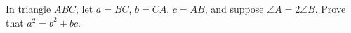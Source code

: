 In triangle $ABC$, let $a=BC$, $b=CA$, $c=AB$, and suppose $\angle A=2\angle B$. Prove that $a^2=b^2+bc$.
